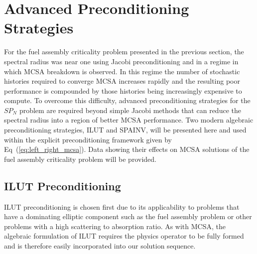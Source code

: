 \clearpage

\section{Advanced Preconditioning Strategies}
\label{subsec:spn_advanced_preconditioning}
For the fuel assembly criticality problem presented in the previous
section, the spectral radius was near one using Jacobi preconditioning
and in a regime in which MCSA breakdown is observed. In this regime
the number of stochastic histories required to converge MCSA increases
rapidly and the resulting poor performance is compounded by those
histories being increasingly expensive to compute. To overcome this
difficulty, advanced preconditioning strategies for the $SP_N$ problem
are required beyond simple Jacobi methods that can reduce the spectral
radius into a region of better MCSA performance. Two modern algebraic
preconditioning strategies, ILUT and SPAINV, will be presented here
and used within the explicit preconditioning framework given by
Eq~(\ref{eq:left_right_mcsa}). Data showing their effects on MCSA
solutions of the fuel assembly criticality problem will be provided.

\subsection{ILUT Preconditioning}
\label{subsec:spn_ilut_preconditioning}
ILUT preconditioning is chosen first due to its applicability to
problems that have a dominating elliptic component such as the fuel
assembly problem or other problems with a high scattering to
absorption ratio. As with MCSA, the algebraic formulation of ILUT
requires the physics operator to be fully formed and is therefore
easily incorporated into our solution sequence. 

